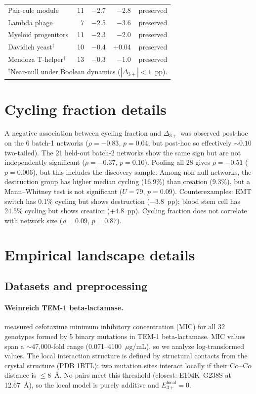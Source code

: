 \documentclass[10pt]{article}
\begin{document}
\begin{table}[h]
\begin{tabular}{lrrrr}
Pair-rule module & 11 & $-$2.7 & $-$2.8 & preserved \\
Lambda phage & 7 & $-$2.5 & $-$3.6 & preserved \\
Myeloid progenitors & 11 & $-$2.3 & $-$2.0 & preserved \\
Davidich yeast$^\dagger$ & 10 & $-$0.4 & $+$0.04 & preserved \\
Mendoza T-helper$^\dagger$ & 13 & $-$0.3 & $-$1.0 & preserved \\
\bottomrule
\multicolumn{5}{l}{\footnotesize $^\dagger$Near-null under Boolean dynamics ($|\Delta_{3+}| < 1$~pp).} \\
\end{tabular}
\end{table}


\section{Cycling fraction details}
\label{supp:cycling}

A negative association between cycling fraction and $\Delta_{3+}$
was observed post-hoc on the 6 batch-1 networks ($\rho = -0.83$,
$p = 0.04$, but post-hoc so effectively $\sim 0.10$ two-tailed).
The 21 held-out batch-2 networks show the same sign but are not
independently significant ($\rho = -0.37$, $p = 0.10$). Pooling
all 28 gives $\rho = -0.51$ ($p = 0.006$), but this includes the
discovery sample. Among non-null networks, the destruction group
has higher median cycling (16.9\%) than creation (9.3\%), but a
Mann--Whitney test is not significant ($U = 79$, $p = 0.09$).
Counterexamples: EMT switch has 0.1\% cycling but shows destruction
($-3.8$~pp); blood stem cell has 24.5\% cycling but shows creation
($+4.8$~pp). Cycling fraction does not correlate with network size
($\rho = 0.09$, $p = 0.87$).


\section{Empirical landscape details}
\label{supp:empirical}

\subsection*{Datasets and preprocessing}

\paragraph{Weinreich TEM-1 beta-lactamase.}
\citet{weinreich2006darwinian} measured cefotaxime minimum
inhibitory concentration (MIC) for all 32 genotypes formed by 5
binary mutations in TEM-1 beta-lactamase. MIC values span a
$\sim$47{,}000-fold range (0.071--4100~$\mu$g/mL), so we analyze
log-transformed values. The local interaction structure is defined
by structural contacts from the crystal structure (PDB 1BTL): two
mutation sites interact locally if their C$\alpha$--C$\alpha$
distance is $\leq 8$~\AA. No pairs meet this threshold (closest:
E104K--G238S at 12.67~\AA), so the local model is purely additive
and $E_{3+}^{\mathrm{local}} = 0$.
\end{document}
